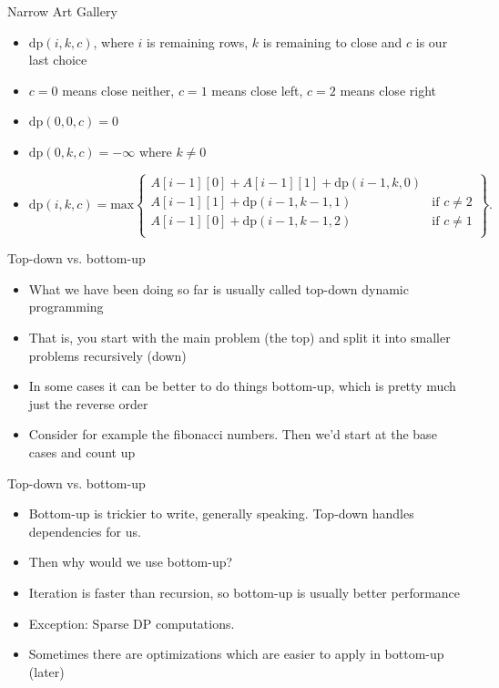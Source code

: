 \documentclass{beamer}
\begin{document}
\begin{frame}[plain]{Narrow Art Gallery}
    \begin{itemize}
        \item<1-> $\mathrm{dp}(i, k, c)$, where $i$ is remaining rows, $k$ is remaining to close and $c$ is our last choice
        \item<1-> $c = 0$ means close neither, $c = 1$ means close left, $c = 2$ means close right
        \item<2-> $\mathrm{dp}(0, 0, c) = 0$
        \item<2-> $\mathrm{dp}(0, k, c) = -\infty$ where $k \neq 0$
        \item<3-> $\mathrm{dp}(i, k, c) = \mathrm{max} \left\{
	\begin{array}{ll}
        A[i-1][0] + A[i-1][1] + \mathrm{dp}(i - 1, k, 0) & \\
        A[i-1][1] + \mathrm{dp}(i - 1, k - 1, 1) & \textrm{if } c \neq 2 \\
        A[i-1][0] + \mathrm{dp}(i - 1, k - 1, 2) & \textrm{if } c \neq 1 \\
	\end{array}
            \right\}.$
    \end{itemize}
\end{frame}

\begin{frame}[plain]{Top-down vs. bottom-up}
    \begin{itemize}
        \item What we have been doing so far is usually called top-down dynamic programming
        \item That is, you start with the main problem (the top) and split it into smaller problems recursively (down)
        \item In some cases it can be better to do things bottom-up, which is pretty much just the reverse order
        \item Consider for example the fibonacci numbers. Then we'd start at the base cases and count up
    \end{itemize}
\end{frame}

\begin{frame}[plain]{Top-down vs. bottom-up}
    \begin{itemize}
        \item Bottom-up is trickier to write, generally speaking. Top-down handles dependencies for us.
        \item Then why would we use bottom-up?
        \item Iteration is faster than recursion, so bottom-up is usually better performance
        \item Exception: Sparse DP computations.
        \item Sometimes there are optimizations which are easier to apply in bottom-up (later)
    \end{itemize}
\end{frame}
\end{document}
